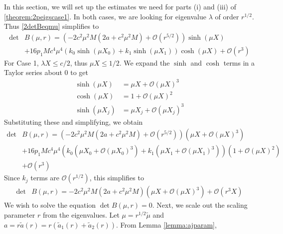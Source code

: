 \documentclass[thesis.tex]{subfiles}
\begin{document}
In this section, we will set up the estimates we need for parts (i) and (iii) of \cref{theorem:2peigscase1}. In both cases, we are looking for eigenvalue $\lambda$ of order $r^{1/2}$. Thus \cref{2detBeqmu} simplifies to
\begin{equation}\label{2detBint1}
\begin{aligned}
\det &B(\mu, r) = \left(-2 c^2 \mu^2 M (2a + c^2 \mu^2 M) +  \mathcal{O}( r^{5/2} )\right) \sinh(\mu X) \\
&+16 p_1 M c^4 \mu^4 ( k_0\sinh(\mu X_0) + k_1 \sinh(\mu X_1) ) \cosh(\mu X) + \mathcal{O}( r^3 ) 
\end{aligned}
\end{equation}
For Case 1, $\lambda X \leq c/2$, thus $\mu X \leq 1/2$. We expand the $\sinh$ and $\cosh$ terms in a Taylor series about 0 to get
\begin{align*}
\sinh(\mu X) &= \mu X + \mathcal{O}\left(\mu X \right)^3 \\
\cosh(\mu X) &= 1 + \mathcal{O}\left(\mu X\right)^2 \\
\sinh(\mu X_j) &= \mu X_j + \mathcal{O}\left(\mu X_j \right)^3
\end{align*}
Substituting these and simplifying, we obtain 
\begin{equation}\label{2detBint2}
\begin{aligned}
\det &B(\mu, r) = \left(-2 c^2 \mu^2 M (2a + c^2 \mu^2 M) +  \mathcal{O}( r^{5/2} )\right) \left(\mu X + \mathcal{O}\left(\mu X \right)^3 \right) \\
&+16 p_1 M c^4 \mu^4 \left( k_0\left( \mu X_0 + \mathcal{O}(\mu X_0)^3 \right)  + k_1\left( \mu X_1 + \mathcal{O}(\mu X_1) ^3 \right) \right) \left( 1 + \mathcal{O}(\mu X)^2 \right) \\
&+ \mathcal{O}( r^3 )
\end{aligned}
\end{equation}
Since $k_j$ terms are $\mathcal{O}(r^{1/2})$, this simplifies to 
\begin{equation}\label{2detBint2}
\begin{aligned}
\det &B(\mu, r) = -2 c^2 \mu^2 M (2a + c^2 \mu^2 M)\left( \mu X + \mathcal{O}\left(\mu X \right)^3 \right)
+ \mathcal{O}( r^3 X ) 
\end{aligned}
\end{equation}
We wish to solve the equation $\det B(\mu, r) = 0$. Next, we scale out the scaling parameter $r$ from the eigenvalues. Let $\mu = r^{1/2}\tilde{\mu}$ and $a = r \tilde{a}(r) = r (\tilde{a}_1(r) + \tilde{a}_2(r))$. From Lemma \ref{lemma:ajparam}, 
\end{document}
